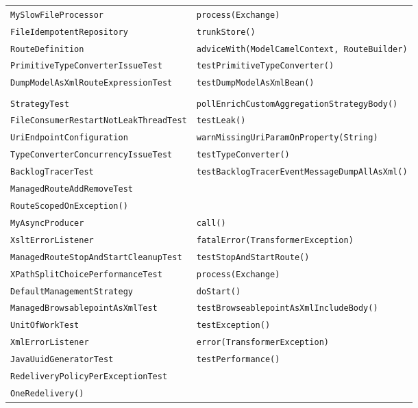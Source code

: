 \begin{center}
\begin{longtable}{ll}
\lstinline/MySlowFileProcessor/&{\lstinline/process(Exchange)/}\\
\lstinline/FileIdempotentRepository/&{\lstinline/trunkStore()/}\\
\lstinline/RouteDefinition/&{\lstinline/adviceWith(ModelCamelContext, RouteBuilder)/}\\
\lstinline/PrimitiveTypeConverterIssueTest/&{\lstinline/testPrimitiveTypeConverter()/}\\
\lstinline/DumpModelAsXmlRouteExpressionTest/&{\lstinline/testDumpModelAsXmlBean()/}\\
\raisebox{-13pt}{\shortstack{\lstinline/PollEnrichFileCustomAggregation/-\\\lstinline/StrategyTest/}}&{\lstinline/pollEnrichCustomAggregationStrategyBody()/}\\
\lstinline/FileConsumerRestartNotLeakThreadTest/&{\lstinline/testLeak()/}\\
\lstinline/UriEndpointConfiguration/&{\lstinline/warnMissingUriParamOnProperty(String)/}\\
\lstinline/TypeConverterConcurrencyIssueTest/&{\lstinline/testTypeConverter()/}\\
\lstinline/BacklogTracerTest/&{\lstinline/testBacklogTracerEventMessageDumpAllAsXml()/}\\
\lstinline/ManagedRouteAddRemoveTest/&\raisebox{-13pt}{\shortstack{\lstinline/testRouteAddRemoteRouteWithRecipientListAnd/-\\\lstinline/RouteScopedOnException()/}}\\
\lstinline/MyAsyncProducer/&{\lstinline/call()/}\\
\lstinline/XsltErrorListener/&{\lstinline/fatalError(TransformerException)/}\\
\lstinline/ManagedRouteStopAndStartCleanupTest/&{\lstinline/testStopAndStartRoute()/}\\
\lstinline/XPathSplitChoicePerformanceTest/&{\lstinline/process(Exchange)/}\\
\lstinline/DefaultManagementStrategy/&{\lstinline/doStart()/}\\
\lstinline/ManagedBrowsablepointAsXmlTest/&{\lstinline/testBrowseablepointAsXmlIncludeBody()/}\\
\lstinline/UnitOfWorkTest/&{\lstinline/testException()/}\\
\lstinline/XmlErrorListener/&{\lstinline/error(TransformerException)/}\\
\lstinline/JavaUuidGeneratorTest/&{\lstinline/testPerformance()/}\\
\lstinline/RedeliveryPolicyPerExceptionTest/&\raisebox{-13pt}{\shortstack{\lstinline/testUsingCustomExceptionHandlerAnd/-\\\lstinline/OneRedelivery()/}}\\

\end{longtable}
\end{center}
